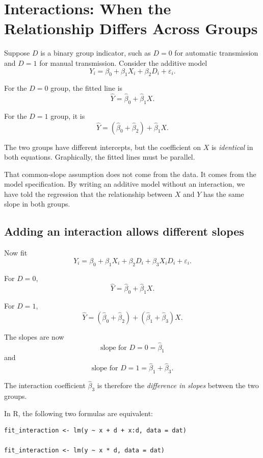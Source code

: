 \documentclass[11pt]{report}
\begin{document}
\section{Interactions: When the Relationship Differs Across Groups}

Suppose \(D\) is a binary group indicator, such as \(D=0\) for automatic transmission and \(D=1\) for manual transmission. Consider the additive model
\[
Y_i=\beta_0+\beta_1X_i+\beta_2D_i+\varepsilon_i.
\]

For the \(D=0\) group, the fitted line is
\[
\widehat{Y}=\widehat{\beta}_0+\widehat{\beta}_1X.
\]

For the \(D=1\) group, it is
\[
\widehat{Y}
=(\widehat{\beta}_0+\widehat{\beta}_2)
+\widehat{\beta}_1X.
\]

The two groups have different intercepts, but the coefficient on \(X\) is \emph{identical} in both equations. Graphically, the fitted lines must be parallel.

That common-slope assumption does not come from the data. It comes from the model specification. By writing an additive model without an interaction, we have told the regression that the relationship between \(X\) and \(Y\) has the same slope in both groups.

\subsection{Adding an interaction allows different slopes}

Now fit
\[
Y_i
=
\beta_0+
\beta_1X_i+
\beta_2D_i+
\beta_3X_iD_i+
\varepsilon_i.
\]

For \(D=0\),
\[
\widehat{Y}
=
\widehat{\beta}_0+
\widehat{\beta}_1X.
\]

For \(D=1\),
\[
\widehat{Y}
=
(\widehat{\beta}_0+\widehat{\beta}_2)
+
(\widehat{\beta}_1+\widehat{\beta}_3)X.
\]

The slopes are now
\[
\text{slope for }D=0=\widehat{\beta}_1
\]
and
\[
\text{slope for }D=1=\widehat{\beta}_1+\widehat{\beta}_3.
\]

The interaction coefficient \(\widehat{\beta}_3\) is therefore the \emph{difference in slopes} between the two groups.

In R, the following two formulas are equivalent:

\begin{lstlisting}
fit_interaction <- lm(y ~ x + d + x:d, data = dat)

fit_interaction <- lm(y ~ x * d, data = dat)
\end{lstlisting}
\end{document}
